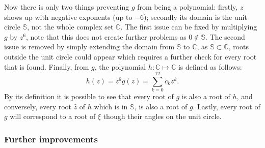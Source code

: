 Now there is only two things preventing $g$ from being a polynomial: firstly, $z$ shows up with negative exponents (up to $-6$); secondly its domain is the unit circle $\mathbb{S}$, not the whole complex set $\mathbb{C}$. 
The first issue can be fixed by multiplying $g$ by $z^6$, note that this does not create further problems as $0\not\in \mathbb{S}$. The second issue is removed by simply extending the domain from $\mathbb{S}$ to $\mathbb{C}$, as $\mathbb{S} \subset \mathbb{C}$, roots outside the unit circle could appear which requires a further check for every root that is found.
Finally, from $g$, the polynomial $h : \mathbb{C} \mapsto \mathbb{C}$ is defined as follows:
\begin{equation}
h(z) = z^6 g(z) = \sum_{k=0}^{12} c_k z^k.
\end{equation}
By its definition it is possible to see that every root of $g$ is also a root of $h$, and conversely, every root $\hat{z}$ of $h$ which is in $\mathbb{S}$, is also a root of $g$. Lastly, every root of $g$ will correspond to a root of $\xi$ though their angles on the unit circle.

\subsubsection{Further improvements}

